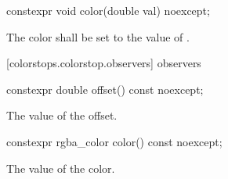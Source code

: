 \begin{itemdecl}
	constexpr void color(double val) noexcept;
\end{itemdecl}
\begin{itemdescr}
	\pnum
	\effects
	The color shall be set to the value of .
\end{itemdescr}

 [colorstops.colorstop.observers]{ observers}

\begin{itemdecl}
	constexpr double offset() const noexcept;
\end{itemdecl}
\begin{itemdescr}
	\pnum
	\returns
	The value of the offset.
\end{itemdescr}

\begin{itemdecl}
	constexpr rgba_color color() const noexcept;
\end{itemdecl}
\begin{itemdescr}
	\pnum
	\returns
	The value of the color.
\end{itemdescr}
